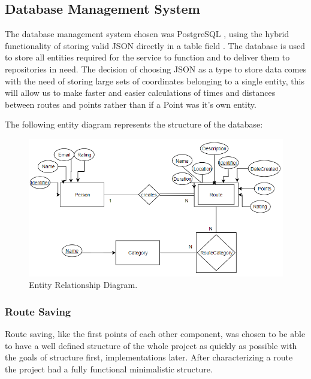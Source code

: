 \documentclass{article}
\begin{document}
            \newpage

        \subsection{Database Management System}
            The database management system chosen was PostgreSQL \cite{postgresql}, using the hybrid functionality of storing valid JSON directly in a table field \cite{postgresqljson}. The database is used to store
            all entities required for the service to function and to deliver them to repositories in need. 
            The decision of choosing JSON as a type to store data comes with the need of storing large sets of coordinates belonging to a single entity, this will allow us to 
            make faster and easier calculations of times and distances between routes and points rather than if a Point was it's own entity. 

            The following entity diagram represents the structure of the database:
            \begin{figure}[h]            
                \includegraphics[width=\textwidth]{images/project-structure/dbms-structure.PNG}
                \caption{Entity Relationship Diagram.}
            \end{figure}  

            \subsubsection*{Route Saving}
            Route saving, like the first points of each other component, was chosen to be able to have a well defined structure of the whole project as quickly as 
            possible with the goals of structure first, implementations later. After characterizing a route \cite{dbmsroutecharacterization} the project had a fully functional minimalistic structure.
\end{document}

